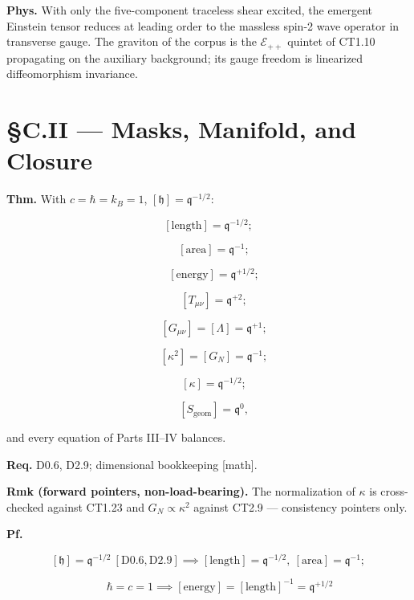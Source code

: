 \begin{theorem}
\textbf{Phys.} With only the five-component traceless shear excited, the emergent Einstein tensor reduces at leading order to the massless spin-2 wave operator in transverse gauge. The graviton of the corpus is the $\mathcal E_{++}$ quintet of CT1.10 propagating on the auxiliary background; its gauge freedom is linearized diffeomorphism invariance.

\end{theorem}

\section[§C.II — Masks, Manifold, and Closure]{\texorpdfstring{§C.II — Masks, Manifold, and Closure}{SC.II - Masks, Manifold, and Closure}}

\begin{theorem}\label{tag:CT2-1}
\textbf{Thm.} With $c=\hbar=k_B=1$, $[\mathfrak h]=\mathfrak q^{-1/2}$:

\[
[\text{length}]=\mathfrak q^{-1/2};
\]

\[
\quad [\text{area}]=\mathfrak q^{-1};
\]

\[
\quad [\text{energy}]=\mathfrak q^{+1/2};
\]

\[
\quad [T_{\mu\nu}]=\mathfrak q^{+2};
\]

\[
\quad [G_{\mu\nu}]=[\Lambda]=\mathfrak q^{+1};
\]

\[
\quad [\kappa^2]=[G_N]=\mathfrak q^{-1};
\]

\[
\quad [\kappa]=\mathfrak q^{-1/2};
\]

\[
\quad [S_{\mathrm{geom}}]=\mathfrak q^{0},
\]

and every equation of Parts III–IV balances.

\textbf{Req.} D0.6, D2.9; dimensional bookkeeping [math].

\textbf{Rmk (forward pointers, non-load-bearing).} The normalization of $\kappa$ is cross-checked against CT1.23 and $G_N\propto\kappa^2$ against CT2.9 — consistency pointers only.

\textbf{Pf.}

\[
[\mathfrak h]=\mathfrak q^{-1/2}\ [\mathrm{D0.6},\mathrm{D2.9}]\implies[\text{length}]=\mathfrak q^{-1/2},\ [\text{area}]=\mathfrak q^{-1};
\]

\[
\qquad \hbar=c=1\implies[\text{energy}]=[\text{length}]^{-1}=\mathfrak q^{+1/2}
\]


\end{theorem}

